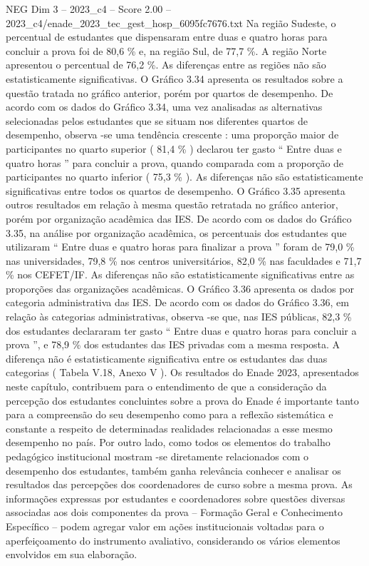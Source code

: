 \begin{textsample}{NEG Dim 3 – 2023\_c4 – Score 2.00 – 2023\_c4/enade\_2023\_tec\_gest\_hosp\_6095fc7676.txt}
Na região Sudeste, o percentual de estudantes que dispensaram entre duas e quatro horas para concluir a prova foi de 80,6 \% e, na região Sul, de 77,7 \%.
A região Norte apresentou o percentual de 76,2 \%.
As diferenças entre as regiões não são estatisticamente significativas.
O Gráfico 3.34 apresenta os resultados sobre a questão tratada no gráfico anterior, porém por quartos de desempenho.
De acordo com os dados do Gráfico 3.34, uma vez analisadas as alternativas selecionadas pelos estudantes que se situam nos diferentes quartos de desempenho, observa -se uma tendência crescente : uma proporção maior de participantes no quarto superior ( 81,4 \% ) declarou ter gasto “ Entre duas e quatro horas ” para concluir a prova, quando comparada com a proporção de participantes no quarto inferior ( 75,3 \% ).
As diferenças não são estatisticamente significativas entre todos os quartos de desempenho.
O Gráfico 3.35 apresenta outros resultados em relação à mesma questão retratada no gráfico anterior, porém por organização acadêmica das IES.
De acordo com os dados do Gráfico 3.35, na análise por organização acadêmica, os percentuais dos estudantes que utilizaram “ Entre duas e quatro horas para finalizar a prova ” foram de 79,0 \% nas universidades, 79,8 \% nos centros universitários, 82,0 \% nas faculdades e 71,7 \% nos CEFET/IF.
As diferenças não são estatisticamente significativas entre as proporções das organizações acadêmicas.
O Gráfico 3.36 apresenta os dados por categoria administrativa das IES.
De acordo com os dados do Gráfico 3.36, em relação às categorias administrativas, observa -se que, nas IES públicas, 82,3 \% dos estudantes declararam ter gasto “ Entre duas e quatro horas para concluir a prova ”, e 78,9 \% dos estudantes das IES privadas com a mesma resposta.
A diferença não é estatisticamente significativa entre os estudantes das duas categorias ( Tabela V.18, Anexo V ).
Os resultados do Enade 2023, apresentados neste capítulo, contribuem para o entendimento de que a consideração da percepção dos estudantes concluintes sobre a prova do Enade é importante tanto para a compreensão do seu desempenho como para a reflexão sistemática e constante a respeito de determinadas realidades relacionadas a esse mesmo desempenho no país.
Por outro lado, como todos os elementos do trabalho pedagógico institucional mostram -se diretamente relacionados com o desempenho dos estudantes, também ganha relevância conhecer e analisar os resultados das percepções dos coordenadores de curso sobre a mesma prova.
As informações expressas por estudantes e coordenadores sobre questões diversas associadas aos dois componentes da prova – Formação Geral e Conhecimento Específico – podem agregar valor em ações institucionais voltadas para o aperfeiçoamento do instrumento avaliativo, considerando os vários elementos envolvidos em sua elaboração.

\end{textsample}

